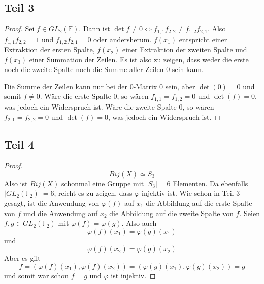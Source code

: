 \documentclass[10pt,a4paper]{article}
\begin{document}
\subsection{Teil 3}

\begin{proof}
  Sei $f \in GL_{2}(\mathbb{F})$.
  Dann ist $\det f \ne 0 \Leftrightarrow f_{1,1}f_{2,2} \ne f_{1,2}f_{2,1}$.
  Also $f_{1,1}f_{2,2} = 1$ und $f_{1,2}f_{2,1} = 0$ oder andersherum.
  $f(x_{1})$ entspricht einer Extraktion der ersten Spalte, $f(x_{2})$ einer Extraktion der zweiten Spalte und $f(x_{3})$ einer Summation der Zeilen.
  Es ist also zu zeigen, dass weder die erste noch die zweite Spalte noch die Summe aller Zeilen $0$ sein kann.

  Die Summe der Zeilen kann nur bei der $0$-Matrix $0$ sein, aber $\det(0) = 0$ und somit $f \ne 0$.
  Wäre die erste Spalte $0$, so wären $f_{1,1} = f_{1,2} = 0$ und $\det(f) = 0$, was jedoch ein Widerspruch ist.
  Wäre die zweite Spalte $0$, so wären $f_{2,1} = f_{2,2} = 0$ und $\det(f) = 0$, was jedoch ein Widerspruch ist.
\end{proof}

\subsection{Teil 4}

\begin{proof}
  \begin{equation}
    Bij(X) \simeq S_{3}
  \end{equation}
  Also ist $Bij(X)$ schonmal eine Gruppe mit $|S_{3}| = 6$ Elementen.
  Da ebenfalls $|GL_{2}(\mathbb{F}_{2})| = 6$, reicht es zu zeigen, dass $\varphi$ injektiv ist.
  Wie schon in Teil 3 gesagt, ist die Anwendung von $\varphi(f)$ auf $x_{1}$ die Abbildung auf die erste Spalte von $f$ und die Anwendung auf $x_{2}$ die Abbildung auf die zweite Spalte von $f$.
  Seien $f, g \in GL_{2}(\mathbb{F}_{2})$ mit $\varphi(f) = \varphi(g)$.
  Also auch
  \begin{equation}
    \varphi(f)(x_{1}) = \varphi(g)(x_{1})
  \end{equation}
  und
  \begin{equation}
    \varphi(f)(x_{2}) = \varphi(g)(x_{2})
  \end{equation}
  Aber es gilt
  \begin{equation}
    f = \left( \varphi(f)(x_{1}), \varphi(f)(x_{2}) \right) = \left( \varphi(g)(x_{1}), \varphi(g)(x_{2}) \right) = g
  \end{equation}
  und somit war schon $f = g$ und $\varphi$ ist injektiv.
\end{proof}
\end{document}
